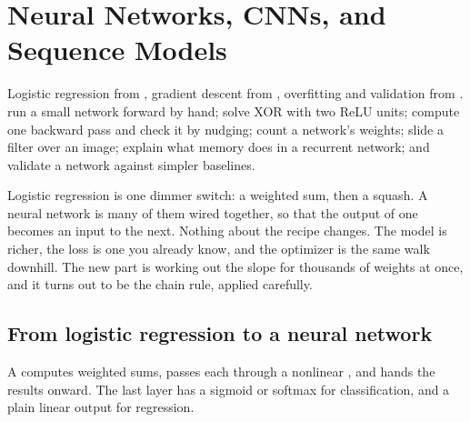 \chapter{Neural Networks, CNNs, and Sequence Models}
\label{ch:deep}

\chapterguide%
  {Logistic regression from , gradient descent from , overfitting and validation from .}
  {run a small network forward by hand; solve XOR with two ReLU units; compute one backward pass and check it by nudging; count a network's weights; slide a filter over an image; explain what memory does in a recurrent network; and validate a network against simpler baselines.}

Logistic regression is one dimmer switch: a weighted sum, then a squash. A neural network is many of them wired together, so that the output of one becomes an input to the next. Nothing about the recipe changes. The model is richer, the loss is one you already know, and the optimizer is the same walk downhill. The new part is working out the slope for thousands of weights at once, and it turns out to be the chain rule, applied carefully.

\section{From logistic regression to a neural network}

A  computes weighted sums, passes each through a nonlinear , and hands the results onward. The last layer has a sigmoid or softmax for classification, and a plain linear output for regression.

